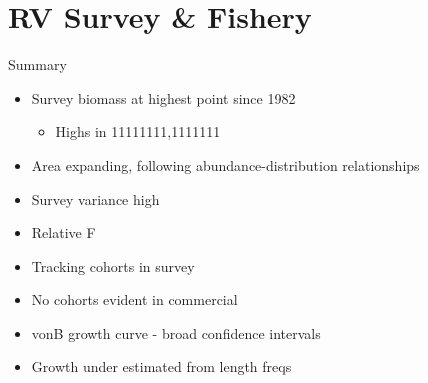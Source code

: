 \documentclass{beamer}
\begin{document}
\section{RV Survey \& Fishery}
\begin{frame}
\begin{block}{Summary}
\begin{itemize}
	\item Survey biomass at highest point since 1982
	\begin{itemize}
		\item Highs in 11111111,1111111
	\end{itemize}
	\item Area expanding, following abundance-distribution relationships
	\item Survey variance high
	\item Relative F
	\item Tracking cohorts in survey
	\item No cohorts evident in commercial
	\item vonB growth curve - broad confidence intervals
	\item Growth under estimated from length freqs 
\end{itemize}
\end{block}
\end{frame}
\end{document}
